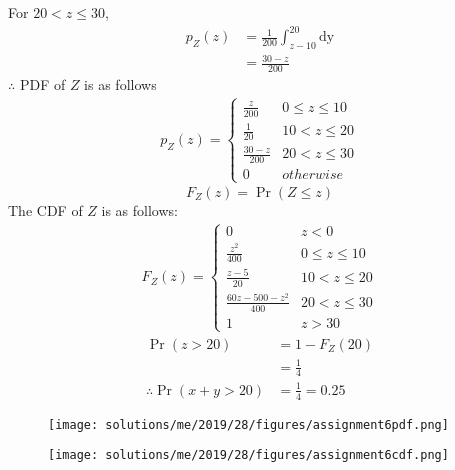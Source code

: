 For $ 20 < z \leq 30 $,
\begin{align}
p_Z(z) &=\frac{1}{200}  \int_{z-10}^{20}\mathrm{dy}  \\
       &= \frac{30-z}{200} \label{me2019-28:9}
\end{align}
$\therefore$ PDF of $Z$ is as follows
\begin{align}
p_{Z}(z)  = 
\begin{cases}
  \frac{z}{200}& 0 \leq z \leq 10 \\
  \frac{1}{20} & 10 < z \leq 20 \\
  \frac{30-z}{200} & 20 < z \leq 30 \\
  0 & otherwise \label{me2019-28:10}
\end{cases}
\end{align}
\begin{equation}
F_Z(z) = \Pr(Z \leq z) \label{me2019-28:cdf}
\end{equation}
The CDF  of $Z$ is as follows:
\begin{align}
F_Z(z)  = 
\begin{cases}
  0 & z < 0 \\
  \frac{z^2}{400} & 0 \leq z \leq 10 \\
  \frac{z-5}{20} & 10< z \leq 20 \\
  \frac{60z -500 -z^2}{400} & 20< z \leq 30 \\
  1 & z > 30 \label{me2019-28:11}
\end{cases}
\end{align}
\begin{align}
\Pr(z > 20)&= 1- F_Z(20) \\
           &=\frac{1}{4} \label{me2019-28:12} \\
\therefore \Pr(x+y>20)&=\frac{1}{4}=0.25
\end{align}
\begin{figure}[htb!]
\begin{center}
\texttt{[image: solutions/me/2019/28/figures/assignment6pdf.png]}
\end{center}
\end{figure}

\begin{figure}[htb!]
\begin{center}
\texttt{[image: solutions/me/2019/28/figures/assignment6cdf.png]}
\end{center}
\end{figure}

